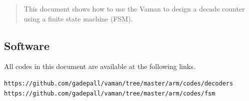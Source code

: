 \documentclass[journal,12pt,twocolumn]{IEEEtran}
\begin{document}
%




%
\fi
\begin{abstract}
  This document shows how to use the Vaman to design a decade counter using a finite state machine (FSM).



\end{abstract}

% 
\subsection{Software}
All codes in this document are available at the following links. 
\begin{lstlisting}
https://github.com/gadepall/vaman/tree/master/arm/codes/decoders
https://github.com/gadepall/vaman/tree/master/arm/codes/fsm
\end{lstlisting}
%
\end{document}
